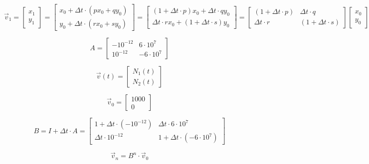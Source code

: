 \documentclass{article}
\begin{document}
$$
\vec v_1 =
\begin{bmatrix}
  x_1 \\
  y_1
\end{bmatrix}
=
\begin{bmatrix}
  x_0 + \Delta t \cdot (px_0 + qy_0) \\
  y_0 + \Delta t \cdot (rx_0 + sy_0)
\end{bmatrix}
=
\begin{bmatrix}
  (1 + \Delta t \cdot p)x_0 + \Delta t \cdot qy_0 \\
  \Delta t \cdot rx_0 + (1 + \Delta t \cdot s)y_0
\end{bmatrix}
=
\begin{bmatrix}
  (1 + \Delta t \cdot p) & \Delta t \cdot q \\
  \Delta t \cdot r & (1 + \Delta t \cdot s)
\end{bmatrix}
\begin{bmatrix}
  x_0 \\
  y_0
\end{bmatrix}
= 
B \cdot \vec v_0
$$

$$
A = 
\begin{bmatrix}
  -10^{-12} & 6 \cdot 10^7 \\
  10^{-12} & -6 \cdot 10^7
\end{bmatrix}
$$

$$\vec v(t) = 
\begin{bmatrix}
  N_1(t) \\
  N_2(t)
\end{bmatrix}
$$

$$
\vec v_0 =
\begin{bmatrix}
  1000 \\
  0
\end{bmatrix}
$$

$$
B = I + \Delta t \cdot A
= \begin{bmatrix}
  1 + \Delta t \cdot (-10^{-12}) & \Delta t \cdot 6 \cdot 10^7 \\
  \Delta t \cdot 10^{-12} & 1 + \Delta t \cdot (-6 \cdot 10^7)
\end{bmatrix}
$$


$$
\vec v_n = B^n \cdot \vec v_0
$$
\end{document}
